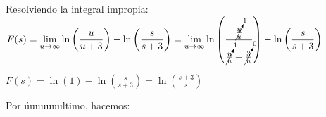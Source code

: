 \documentclass[11pt]{article}
\begin{document}
	Resolviendo la integral impropia:\\
	$\displaystyle F(s)=\lim\limits_{u\rightarrow \infty}\ln\left(\frac{u}{u+3}\right)-\ln\left(\frac{s}{s+3}\right)=\lim\limits_{u\rightarrow \infty} \ln\left(\frac{\cancelto{1}{\frac{u}{u}}}{\cancelto{1}{\frac{u}{u}}+\cancelto{0}{\frac{3}{u}}}\right) - \ln\left(\frac{s}{s+3}\right)$
	
	$\displaystyle F(s)=\ln(1)-\ln\left(\frac{s}{s+3}\right)=\ln\left(\frac{s+3}{s}\right)$
	
	Por úuuuuuultimo, hacemos: 
	
	
\end{document}
